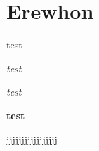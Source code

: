 \switchtobodyfont[erewhon,10pt]
\chapter[erewhon]{Erewhon}



{\sc test}

{\it test}

{\sl test}

{\bf test}


jjjjjjjjjjjjjjjjj

